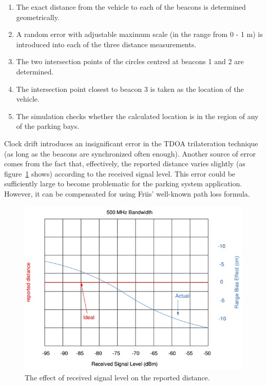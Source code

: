 \begin{enumerate}
\item The exact distance from the vehicle to each of the beacons is determined geometrically.
\item A random error with adjustable maximum scale (in the range from 0 - 1 m) is introduced into each of the three distance measurements.
\item The two intersection points of the circles centred at beacons 1 and 2 are determined.
\item The intersection point closest to beacon 3 is taken as the location of the vehicle.
\item The simulation checks whether the calculated location is in the region of any of the parking bays.
\end{enumerate}

\newpage
{}
Clock drift introduces an insignificant error in the TDOA trilateration technique (as long as the beacons are synchronized often enough). Another source of error comes from the fact that, effectively, the reported distance varies slightly (as figure~\ref{fig:reported-distance} shows) according to the received signal level. This error could be sufficiently large to become problematic for the parking system application. However, it can be compensated for using Friis' well-known path loss formula.\cite{2}

\begin{figure}[H]
\begin{center}
\includegraphics[scale=0.8]{data/software/4.jpg}
\caption{The effect of received signal level on the reported distance.\cite{2}}
\label{fig:reported-distance}
\end{center}
\end{figure}

